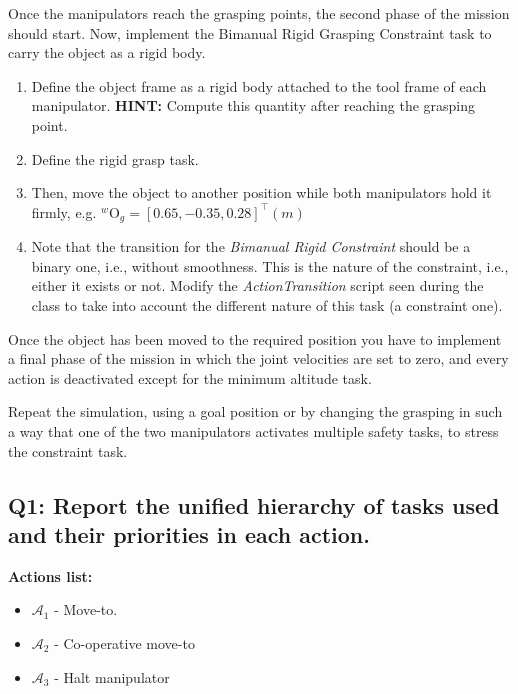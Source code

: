 \documentclass{article}
\begin{document}
Once the manipulators reach the grasping points, the second phase of the mission should start. Now, implement the Bimanual Rigid Grasping Constraint task to carry the object as a rigid body. 
\begin{enumerate}
	\item Define the object frame as a rigid body attached to the tool frame of each manipulator. \textbf{HINT:} Compute this quantity after reaching the grasping point.
	\item Define the rigid grasp task.
	\item Then, move the object to another position while both manipulators hold it firmly, e.g. $ ^{w}\textrm{O}_{g} = [0.65, -0.35, 0.28]^{\top}(m)$
	\item Note that the transition for the \textit{Bimanual Rigid Constraint} should be a binary one, i.e., without smoothness. This is the nature of the constraint, i.e., either it exists or not. Modify the \emph{ActionTransition} script seen during the class to take into account the different nature of this task (a constraint one).
	
	
\end{enumerate}
 
Once the object has been moved to the required position you have to implement a final phase of the mission in which the joint velocities are set to zero, and every action is deactivated except for the minimum altitude task.

Repeat the simulation, using a goal position or by changing the grasping in such a way that one of the two manipulators activates multiple safety tasks, to stress the constraint task.

\subsection{Q1: Report the unified hierarchy of tasks used and their priorities in each action.}


\textbf{Actions list:}

\begin{itemize}
	\item $\mathcal{A}_{1}$ - Move-to.
	\item $\mathcal{A}_{2}$ - Co-operative move-to
	\item $\mathcal{A}_{3}$ - Halt manipulator
\end{itemize}
\end{document}
